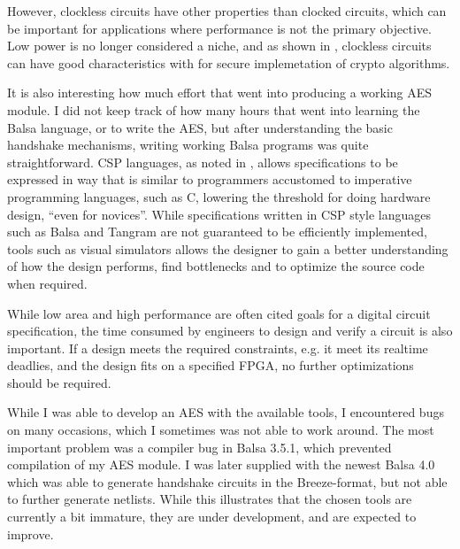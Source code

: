 However, clockless circuits have other properties than clocked
circuits, which can be important for applications where performance is
not the primary objective. Low power is no longer considered a niche,
and as shown in \cite{claes}, clockless circuits can have good
characteristics with for secure implemetation of crypto algorithms.

It is also interesting how much effort that went into producing a
working AES module. I did not keep track of how many hours that went
into learning the Balsa language, or to write the AES, but after
understanding the basic handshake mechanisms, writing working Balsa
programs was quite straightforward. CSP languages, as noted in
\cite{taylor}, allows specifications to be expressed in way that is
similar to programmers accustomed to imperative programming languages,
such as C, lowering the threshold for doing hardware design, ``even
for novices''. While specifications written in CSP style languages
such as Balsa and Tangram are not guaranteed to be efficiently
implemented, tools such as visual simulators allows the designer to
gain a better understanding of how the design performs, find
bottlenecks and to optimize the source code when required.

While low area and high performance are often cited goals for a
digital circuit specification, the time consumed by engineers to
design and verify a circuit is also important. If a design meets the
required constraints, e.g. it meet its realtime deadlies, and the
design fits on a specified FPGA, no further optimizations should be
required.

While I was able to develop an AES with the available tools, I
encountered bugs on many occasions, which I sometimes was not able to
work around. The most important problem was a compiler bug in Balsa
3.5.1, which prevented compilation of my AES module. I was later
supplied with the newest Balsa 4.0 which was able to generate
handshake circuits in the Breeze-format, but not able to further
generate netlists. While this illustrates that the chosen tools are
currently a bit immature, they are under development, and are expected
to improve.

